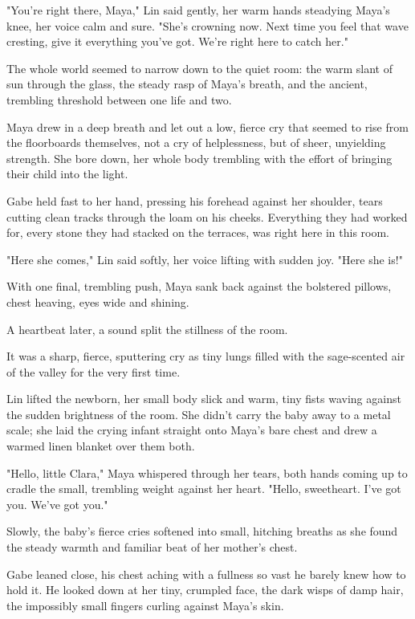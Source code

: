 "You're right there, Maya," Lin said gently, her warm hands steadying Maya's knee, her voice calm and sure. "She's crowning now. Next time you feel that wave cresting, give it everything you've got. We're right here to catch her."

The whole world seemed to narrow down to the quiet room: the warm slant of sun through the glass, the steady rasp of Maya’s breath, and the ancient, trembling threshold between one life and two. 

Maya drew in a deep breath and let out a low, fierce cry that seemed to rise from the floorboards themselves, not a cry of helplessness, but of sheer, unyielding strength. She bore down, her whole body trembling with the effort of bringing their child into the light.

Gabe held fast to her hand, pressing his forehead against her shoulder, tears cutting clean tracks through the loam on his cheeks. Everything they had worked for, every stone they had stacked on the terraces, was right here in this room. 

"Here she comes," Lin said softly, her voice lifting with sudden joy. "Here she is!"

With one final, trembling push, Maya sank back against the bolstered pillows, chest heaving, eyes wide and shining.

A heartbeat later, a sound split the stillness of the room. 

It was a sharp, fierce, sputtering cry as tiny lungs filled with the sage-scented air of the valley for the very first time. 

Lin lifted the newborn, her small body slick and warm, tiny fists waving against the sudden brightness of the room. She didn't carry the baby away to a metal scale; she laid the crying infant straight onto Maya’s bare chest and drew a warmed linen blanket over them both. 

"Hello, little Clara," Maya whispered through her tears, both hands coming up to cradle the small, trembling weight against her heart. "Hello, sweetheart. I've got you. We've got you."

Slowly, the baby’s fierce cries softened into small, hitching breaths as she found the steady warmth and familiar beat of her mother's chest. 

Gabe leaned close, his chest aching with a fullness so vast he barely knew how to hold it. He looked down at her tiny, crumpled face, the dark wisps of damp hair, the impossibly small fingers curling against Maya’s skin. 

